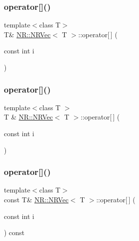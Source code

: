 \mbox{\label{classNR_1_1NRVec_aa06286b2b6a9a51dd275d17c1b777bed}} 
\subsubsection{\texorpdfstring{operator[]()}{operator[]()}\hspace{0.1cm}{\footnotesize\ttfamily [1/4]}}
{\footnotesize\ttfamily template$<$class T$>$ \\
T\& \mbox{\hyperlink{classNR_1_1NRVec}{N\+R\+::\+N\+R\+Vec}}$<$ T $>$\+::operator\mbox{[}$\,$\mbox{]} (\begin{DoxyParamCaption}\item[{const int}]{i }\end{DoxyParamCaption})\hspace{0.3cm}{\ttfamily [inline]}}

\mbox{\label{classNR_1_1NRVec_acc741d3714e2d6ce2480dad3ba5d7f08}} 
\subsubsection{\texorpdfstring{operator[]()}{operator[]()}\hspace{0.1cm}{\footnotesize\ttfamily [2/4]}}
{\footnotesize\ttfamily template$<$class T $>$ \\
T \& \mbox{\hyperlink{classNR_1_1NRVec}{N\+R\+::\+N\+R\+Vec}}$<$ T $>$\+::operator\mbox{[}$\,$\mbox{]} (\begin{DoxyParamCaption}\item[{const int}]{i }\end{DoxyParamCaption})\hspace{0.3cm}{\ttfamily [inline]}}

\mbox{\label{classNR_1_1NRVec_a96caa29f8fb313218804268101c95e1a}} 
\subsubsection{\texorpdfstring{operator[]()}{operator[]()}\hspace{0.1cm}{\footnotesize\ttfamily [3/4]}}
{\footnotesize\ttfamily template$<$class T$>$ \\
const T\& \mbox{\hyperlink{classNR_1_1NRVec}{N\+R\+::\+N\+R\+Vec}}$<$ T $>$\+::operator\mbox{[}$\,$\mbox{]} (\begin{DoxyParamCaption}\item[{const int}]{i }\end{DoxyParamCaption}) const\hspace{0.3cm}{\ttfamily [inline]}}


